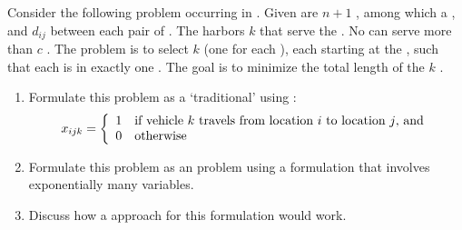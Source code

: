 \begin{exercise}
Consider the following problem occurring in . Given are $n+1$ , among which a , and  $d_{ij}$ between each pair of . The  harbors $k$  that serve the . No  can serve more than $c$ . The problem is to select $k$  (one for each ), each starting at the , such that each  is in exactly one . The goal is to minimize the total length of the $k$ .
\begin{enumerate}
 \item Formulate this problem as a ‘traditional'  using :
 \begin{equation}
  x_{ijk}=\left\{\begin{array}{ll} 1&\mbox{if vehicle $k$ travels from location $i$ to location $j$, and}\\0&\mbox{otherwise} \end{array}\right.
 \end{equation}
 \item Formulate this problem as an  problem using a formulation that involves exponentially many variables.
 \item Discuss how a  approach for this formulation would work.
\end{enumerate}
\end{exercise}